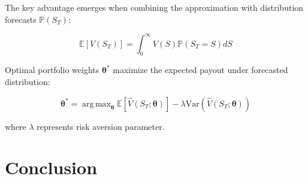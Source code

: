 \documentclass[12pt]{article}
\DeclareMathOperator*{\argmax}{arg\,max}
\begin{document}
The key advantage emerges when combining the approximation with distribution 
forecasts $\mathbb{P}(S_T)$:
 
\begin{equation}
\mathbb{E}[V(S_T)] = 
    \int_{0}^{\infty} 
        V(S) \mathbb{P}(S_T = S) dS
\end{equation}

Optimal portfolio weights $\boldsymbol{\theta}^*$ maximize the expected payout under 
forecasted distribution:

\begin{equation}
\boldsymbol{\theta}^* = 
    \argmax_{\boldsymbol{\theta}} 
        \mathbb{E}\left[\hat{V}(S_T;\boldsymbol{\theta})\right] - 
        \lambda \text{Var}\left(\hat{V}(S_T;\boldsymbol{\theta})\right)
\end{equation}

where $\lambda$ represents risk aversion parameter.

\section{Conclusion}



\end{document}
